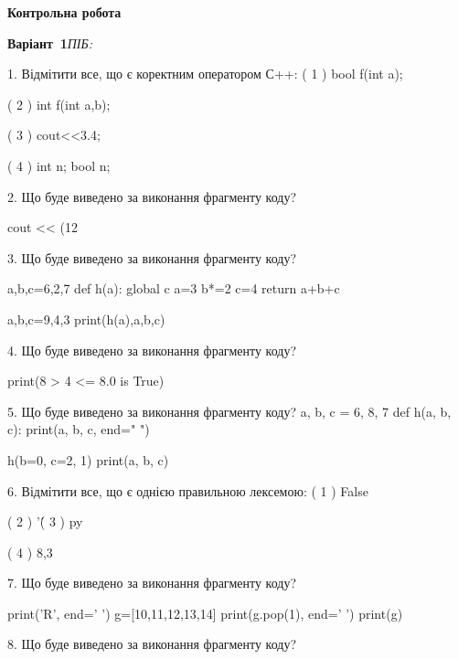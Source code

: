 \documentclass[11pt]{article}
\begin{document}
{\large\textbf{Контрольна робота}}

\textbf{Варіант \No\,1}\hfill \textit{ПІБ:}\,\underline{\hspace{60mm}}
\vspace{4mm}

1. %
Відмітити все, що є коректним оператором С++:
( 1 ) bool f(int a);

( 2 ) int f(int a,b);

( 3 ) cout<<3.4;

( 4 ) int n; bool n;
\vspace{5mm}

2. Що буде виведено за виконання фрагменту коду?

cout << (12 %
\vspace{5mm}

3. Що буде виведено за виконання фрагменту коду?

a,b,c=6,2,7
def h(a):
global c    a=3
    b*=2
    c=4
    return a+b+c

a,b,c=9,4,3
print(h(a),a,b,c)
\vspace{5mm}

4. Що буде виведено за виконання фрагменту коду?

print(8 > 4 <= 8.0 is True)
\vspace{5mm}

5. Що буде виведено за виконання фрагменту коду?
a, b, c = 6, 8, 7
def h(a, b, c):
    print(a, b, c, end=" ")

h(b=0, c=2, 1)
print(a, b, c)
\vspace{5mm}

6. %
Відмітити все, що є однією правильною лексемою:
( 1 ) False

( 2 ) '\'

( 3 ) py

( 4 ) 8,3
\vspace{5mm}

7. Що буде виведено за виконання фрагменту коду?

print('R', end=' ')
g=[10,11,12,13,14]
print(g.pop(1), end=' ')
print(g)

\vspace{5mm}

8. Що буде виведено за виконання фрагменту коду?
\end{document}
